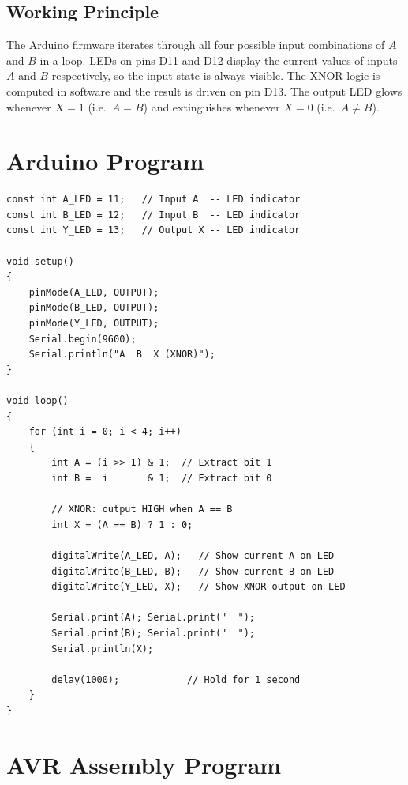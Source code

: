 \documentclass[12pt,a4paper]{article}
\begin{document}
\subsection{Working Principle}

The Arduino firmware iterates through all four possible input combinations of
$A$ and $B$ in a loop. LEDs on pins D11 and D12 display the current values of
inputs $A$ and $B$ respectively, so the input state is always visible. The
XNOR logic is computed in software and the result is driven on pin D13. The
output LED glows whenever $X = 1$ (i.e.\ $A = B$) and extinguishes whenever
$X = 0$ (i.e.\ $A \neq B$).

\newpage
\section{Arduino Program}

\begin{lstlisting}[style=arduinostyle, caption={XNOR Verification --- Arduino C++ Program}]
const int A_LED = 11;   // Input A  -- LED indicator
const int B_LED = 12;   // Input B  -- LED indicator
const int Y_LED = 13;   // Output X -- LED indicator

void setup()
{
    pinMode(A_LED, OUTPUT);
    pinMode(B_LED, OUTPUT);
    pinMode(Y_LED, OUTPUT);
    Serial.begin(9600);
    Serial.println("A  B  X (XNOR)");
}

void loop()
{
    for (int i = 0; i < 4; i++)
    {
        int A = (i >> 1) & 1;  // Extract bit 1
        int B =  i       & 1;  // Extract bit 0

        // XNOR: output HIGH when A == B
        int X = (A == B) ? 1 : 0;

        digitalWrite(A_LED, A);   // Show current A on LED
        digitalWrite(B_LED, B);   // Show current B on LED
        digitalWrite(Y_LED, X);   // Show XNOR output on LED

        Serial.print(A); Serial.print("  ");
        Serial.print(B); Serial.print("  ");
        Serial.println(X);

        delay(1000);            // Hold for 1 second
    }
}
\end{lstlisting}

\newpage
\section{AVR Assembly Program}
\end{document}
